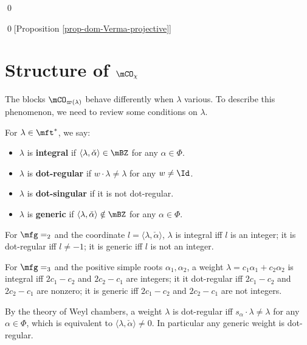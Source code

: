 	\qed

	\qed[Proposition \ref{prop-dom-Verma-projective}]

	\section{Structure of \texorpdfstring{$\mCO_\chi$}{Ochi}}

	The blocks $\mCO_{\varpi(\lambda)}$ behave differently when $\lambda$ various. To describe this phenomenon, we need to review some conditions on $\lambda$.

	\begin{defn}
		\label{defn-integral-weight}
		For $\lambda \in \mft^*$, we say:
		\begin{itemize}
			\item 
				$\lambda$ is \textbf{integral} if $\langle \lambda,\check\alpha \rangle \in \mBZ$ for any $\alpha\in \Phi$.
			\item 
				$\lambda$ is \textbf{dot-regular} if $w\cdot \lambda \neq \lambda$ for any $w\neq \Id$.
			\item
				$\lambda$ is \textbf{dot-singular} if it is not dot-regular.
			\item
				$\lambda$ is \textbf{generic} if $\langle \lambda,\check\alpha \rangle \notin \mBZ$ for any $\alpha\in \Phi$.
		\end{itemize}
	\end{defn}

	\begin{exam}
		For $\mfg=\sl_2$ and the coordinate $l=\langle \lambda,\check\alpha\rangle$, $\lambda$ is integral iff $l$ is an integer; it is dot-regular iff $l\neq -1$; it is generic iff $l$ is not an integer.
	\end{exam}

	\begin{exam}
		For $\mfg=\sl_3$ and the positive simple roots $\alpha_1,\alpha_2$, a weight $\lambda= c_1\alpha_1+c_2\alpha_2$ is integral iff $2c_1-c_2$ and $2c_2-c_1$ are integers; it it dot-regular iff $2c_1-c_2$ and $2c_2-c_1$ are nonzero; it is generic iff $2c_1-c_2$ and $2c_2-c_1$ are not integers.
	\end{exam}

	\begin{rem}
		By the theory of Weyl chambers, a weight $\lambda$ is dot-regular iff $s_\alpha\cdot \lambda \neq \lambda$ for any $\alpha\in \Phi$, which is equivalent to $\langle \lambda,\check\alpha \rangle \neq 0$. In particular any generic weight is dot-regular.
	\end{rem}

